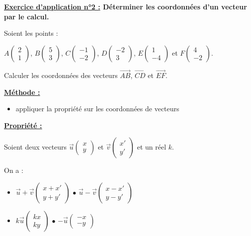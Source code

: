 \documentclass[12pt]{article}
\newcommand*{\Coord}[2]{%
  \ensuremath{
    \begin{pmatrix} 
      #1\\ 
      #2 
    \end{pmatrix}}}
\begin{document}
\begin{mdframed}[
    linewidth=1pt,
    roundcorner=5pt,
    linecolor=RoyalBlue,
    innertopmargin=10pt,
    innerbottommargin=10pt
]
{\color{RoyalBlue}\textbf{\underline{Exercice d'application n°2 :} Déterminer les coordonnées d'un 
vecteur par le calcul.}}

\vspace{5pt}

Soient les points : 

$A\Coord{2}{1}$, $B\Coord{5}{3}$, $C\Coord{-1}{-2}$, $D\Coord{-2}{3}$, $E\Coord{1}{-4}$ et $F\Coord{4}{-2}$.
\vspace{5pt}

Calculer les coordonnées des vecteurs $\overrightarrow{AB}$, $\overrightarrow{CD}$ 
et $\overrightarrow{EF}$.

\begin{mdframed}[
    linewidth=1pt,
    roundcorner=5pt,
    linecolor=black,
    innertopmargin=10pt,
    innerbottommargin=10pt,
    backgroundcolor=gray!15
]
\underline{\textbf{Méthode :}}
\begin{itemize}
    \item appliquer la propriété sur les coordonnées de vecteurs
\end{itemize}
\end{mdframed}

\end{mdframed}

\vspace{10pt}

\begin{mdframed}[
    linewidth=1pt,
    roundcorner=5pt,
    linecolor=Red,
    innertopmargin=10pt,
    innerbottommargin=10pt
]
{\color{Red}\textbf{\underline{Propriété :}}}

Soient deux vecteurs $\overrightarrow{u}\Coord{x}{y}$ et $\overrightarrow{v}\Coord{x'}{y'}$ et un réel 
$k$.

On a :
\begin{itemize} 
\renewcommand{\labelitemi}{$\bullet$}
    \item $\overrightarrow{u} + \overrightarrow{v} \Coord{x+x'}{y+y'}$ \hspace{2cm} $\bullet$
    $\overrightarrow{u} - \overrightarrow{v} \Coord{x-x'}{y-y'}$
    \vspace{10pt}
    \item $k \overrightarrow{u} \Coord{kx}{ky}$ \hspace{3.3cm} $\bullet$ $-\overrightarrow{u}\Coord{-x}{-y}$
\end{itemize}

\end{mdframed}
\end{document}

